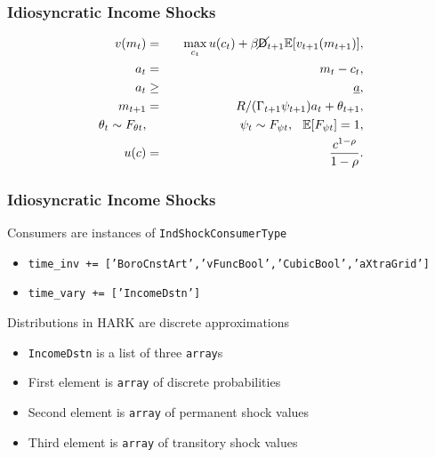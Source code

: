 \documentclass[11pt]{cfpbpresentation}
\newcommand{\E}{\mathbb{E}}
\newcommand{\Die}{\mathsf{D}}
\newcommand{\Live}{\cancel{\Die}}
\begin{document}
\begin{frame}
\frametitle{Idiosyncratic Income Shocks}
\begin{eqnarray*}
v(m_t) &=& \max_{c_t} u(c_t) + \beta \Live_{t+1} \E [v_{t+1}(m_{t+1}) ], \\
a_t &=& m_t - c_t, \\
a_t &\geq& \underline{a}, \\
m_{t+1} &=& R/(\Gamma_{t+1} \psi_{t+1}) a_t + \theta_{t+1}, \\
\theta_t \sim F_{\theta t}, &\qquad& \psi_t \sim F_{\psi t}, \hspace{0.25cm} \E[F_{\psi t}] = 1, \\
u(c) &=& \frac{c^{1-\rho}}{1-\rho}.
\end{eqnarray*}
\end{frame}


\begin{frame}
\frametitle{Idiosyncratic Income Shocks}
Consumers are instances of \texttt{IndShockConsumerType}
\begin{itemize}
\item \texttt{time\_inv += ['BoroCnstArt','vFuncBool','CubicBool','aXtraGrid']}

\item \texttt{time\_vary += ['IncomeDstn']}
\end{itemize}

Distributions in HARK are discrete approximations
\begin{itemize}
\item \texttt{IncomeDstn} is a list of three \texttt{array}s

\item First element is \texttt{array} of discrete probabilities

\item Second element is \texttt{array} of permanent shock values

\item Third element is \texttt{array} of transitory shock values
\end{itemize}
\end{frame}
\end{document}
